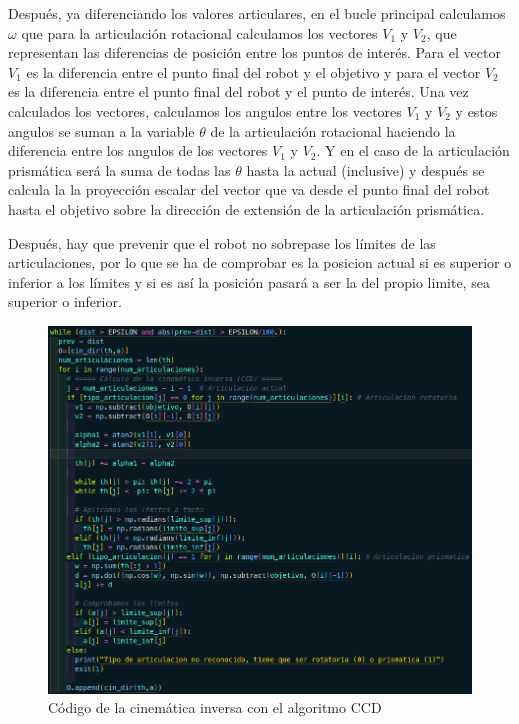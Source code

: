 \documentclass[11pt]{report}
\begin{document}
\newpage

Después, ya diferenciando los valores articulares, en el bucle principal calculamos $\omega$ que para la articulación rotacional 
calculamos los vectores $V_1$ y $V_2$, que representan las diferencias de posición entre los puntos de interés. Para el vector $V_1$ 
es la diferencia entre el punto final del robot y el objetivo y para el vector $V_2$ es la diferencia entre el punto final del robot 
y el punto de interés. Una vez calculados los vectores, calculamos los angulos entre los vectores $V_1$ y $V_2$ y estos angulos se 
suman a la variable $\theta$ de la articulación rotacional haciendo la diferencia entre los angulos de los vectores $V_1$ y $V_2$.
Y en el caso de la articulación prismática será la suma de todas las $\theta$ hasta la actual (inclusive) y después se calcula la
la proyección escalar del vector que va desde el punto final del robot hasta el objetivo sobre la dirección de extensión de la articulación
prismática. 

Después, hay que prevenir que el robot no sobrepase los límites de las articulaciones, por lo que se ha de comprobar es la posicion actual si es superior o inferior a los límites y si 
es así la posición pasará a ser la del propio limite, sea superior o inferior.
\begin{figure}[H]
  \centering
  \includegraphics[scale=0.55]{img/codigo_ci_ccd.png}
  \caption{Código de la cinemática inversa con el algoritmo CCD}
\end{figure}
\end{document}
